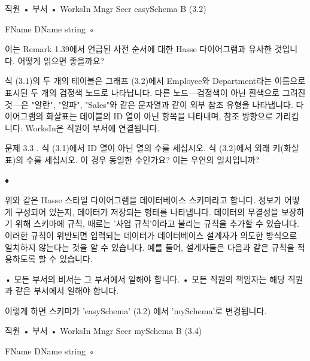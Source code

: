 \documentclass[11pt, a4paper, twoside, openany]{book}
\begin{document}
{\par\medskip
직원
•
부서
•
WorksIn
Mngr
Secr
easySchema B
(3.2)

\par\medskip
FName
DName
string
◦

\par\medskip
이는 Remark 1.39\hspace{0pt}에서 언급된 사전 순서에 대한 Hasse 다이어그램과 유사한 것입니다. 어떻게 읽으면 좋을까요?

\par\medskip
식 (3.1)의 두 개의 테이블은 그래프 (3.2)에서 Employee\hspace{0pt}와 Department\hspace{0pt}라는 이름으로 표시된 두 개의 검정색 노드로 나타납니다. 다른 노드—검정색이 아닌 흰색으로 그려진 것—은 "알란", "알파", "Sales"와 같은 문자열과 같이 외부 참조 유형을 나타냅니다. 다이어그램의 화살표는 테이블의 ID 열이 아닌 항목을 나타내며, 참조 방향으로 가리킵니다: WorksIn\hspace{0pt}은 직원이 부서에 연결됩니다.

\par\medskip
문제 3.3 .
식 (3.1)에서 ID 열이 아닌 열의 수를 세십시오. 식 (3.2)에서 외래 키(화살표)의 수를 세십시오. 이 경우 동일한 수인가요? 이는 우연의 일치입니까?

\par\medskip
♦

\par\medskip
위와 같은 Hasse 스타일 다이어그램을 데이터베이스 스키마라고 합니다. 정보가 어떻게 구성되어 있는지, 데이터가 저장되는 형태를 나타냅니다. 데이터의 무결성을 보장하기 위해 스키마에 규칙, 때로는 '사업 규칙'이라고 불리는 규칙을 추가할 수 있습니다. 이러한 규칙이 위반되면 입력되는 데이터가 데이터베이스 설계자가 의도한 방식으로 일치하지 않는다는 것을 알 수 있습니다. 예를 들어, 설계자들은 다음과 같은 규칙을 적용하도록 할 수 있습니다.

\par\medskip
• 모든 부서의 비서는 그 부서에서 일해야 합니다.
• 모든 직원의 책임자는 해당 직원과 같은 부서에서 일해야 합니다.

\par\medskip
이렇게 하면 스키마가 'easySchema' (3.2) 에서 'mySchema'로 변경됩니다.

\par\medskip
직원
•
부서
•
WorksIn
Mngr
Secr
mySchema B
(3.4)

\par\medskip
FName
DName
string
◦

}
\end{document}
